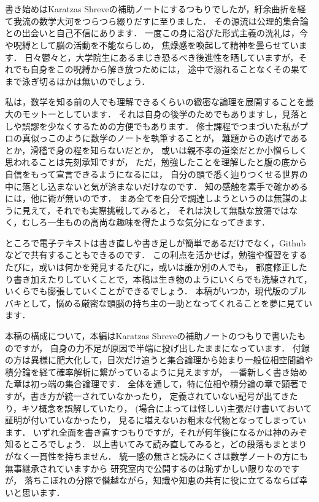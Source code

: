 \chapter*{}
書き始めはKaratzas Shreveの補助ノートにするつもりでしたが，紆余曲折を経て我流の数学大河をつらつら綴りだすに至りました．
その源流は公理的集合論との出会いと自己不信にあります．
一度この身に浴びた形式主義の洗礼は，今や呪縛として脳の活動を不能ならしめ，
焦燥感を喚起して精神を曇らせています．
日々鬱々と，大学院生にあるまじき恐るべき後進性を晒していますが，それでも自身をこの呪縛から解き放つためには，
途中で溺れることなくその果てまで泳ぎ切るほかは無いのでしょう．

私は，数学を知る前の人でも理解できるくらいの緻密な論理を展開することを最大のモットーとしています．
それは自身の後学のためでもありますし，見落としや誤謬を少なくするための方便でもあります．
修士課程でつまづいた私がプロの真似っこのように数学のノートを執筆することが，
難題からの逃げであるとか，滑稽で身の程を知らないだとか，
或いは親不孝の道楽だとか小憎らしく思われることは先刻承知ですが，
ただ，勉強したことを理解したと腹の底から自信をもって宣言できるようになるには，
自分の頭で悉く辿りつくせる世界の中に落とし込まないと気が済まないだけなのです．
知の感触を素手で確かめるには，他に術が無いのです．
まあ全てを自分で調達しようというのは無謀のように見えて，それでも実際挑戦してみると，
それは決して無駄な放蕩ではなく，むしろ一生ものの高尚な趣味を得たような気分になってきます．

ところで電子テキストは書き直しや書き足しが簡単であるだけでなく，Githubなどで共有することもできるのです．
この利点を活かせば，勉強や復習をするたびに，或いは何かを発見するたびに，或いは誰か別の人でも，
都度修正したり書き加えたりしていくことで，本稿は生き物のようにいくらでも洗練されて，
いくらでも膨張していくことができるでしょう．
本稿がいつか，現代版のブルバキとして，悩める厳密な頭脳の持ち主の一助となってくれることを夢に見ています．

本稿の構成について，本編はKaratzas Shreveの補助ノートのつもりで書いたものですが，
自身の力不足が原因で半端に投げ出したままになっています．
付録の方は異様に肥大化して，目次だけ追うと集合論理から始まり一般位相空間論や積分論を経て確率解析に繋がっているように見えますが，
一番新しく書き始めた章は初っ端の集合論理です．
全体を通して，特に位相や積分論の章で顕著ですが，書き方が統一されていなかったり，
定義されていない記号が出てきたり，キソ概念を誤解していたり，
(場合によっては怪しい)主張だけ書いておいて証明が付いていなかったり，
見るに堪えないお粗末な代物となってしまっています．
いずれ全面を書き直すつもりですが，それが何年後になるかは神のみぞ知るところでしょう．
以上書いてみて読み直してみると，どの段落もまとまりがなく一貫性を持ちません．
統一感の無さと読みにくさは数学ノートの方にも無事継承されていますから
研究室内で公開するのは恥ずかしい限りなのですが，
落ちこぼれの分際で僭越ながら，知識や知恵の共有に役に立てるならば幸いと思います．
\\
\\
\\
